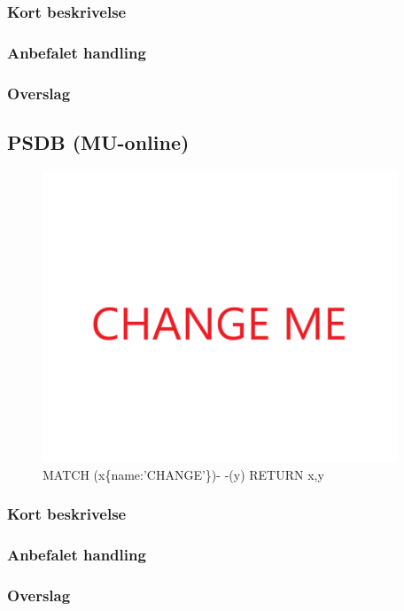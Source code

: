 \documentclass{article}
\begin{document}
\subsubsection{Kort beskrivelse}
\subsubsection{Anbefalet handling}
\subsubsection{Overslag}
\subsection{PSDB (MU-online)}
\begin{figure}[h]
\includegraphics[width=300pt]{CHANGE.PNG}
\caption{MATCH (x\{name:'CHANGE'\})- -(y) RETURN x,y}
\end{figure}
\subsubsection{Kort beskrivelse}
\subsubsection{Anbefalet handling}
\subsubsection{Overslag}
\end{document}

